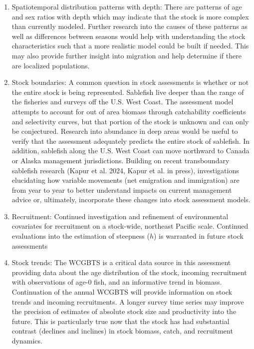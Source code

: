 \documentclass[
  english,
]{article}
\begin{document}
\begin{enumerate}

\item Spatiotemporal distribution patterns with depth: There are patterns of age and sex
ratios with depth which may indicate that the stock is more complex than currently
modeled. Further research into the causes of these patterns as well as differences
between seasons would help with understanding the stock characteristics such that
a more realistic model could be built if needed. This may also provide further insight into
migration and help determine if there are localized populations.

\item Stock boundaries: A common question in stock assessments is whether or not the
entire stock is being represented. Sablefish live deeper than the range of the fisheries
and surveys off the U.S. West Coast. The assessment model attempts to account for out of area biomass
through catchability coefficients and selectivity curves, but that portion of the stock is
unknown and can only be conjectured. Research into abundance in deep areas would
be useful to verify that the assessment adequately predicts the entire stock
of sablefish. In addition, sablefish along the U.S. West Coast can move northward to
Canada or Alaska management jurisdictions. Building on recent transboundary sablefish research
(Kapur et al. 2024, Kapur et al. in press), investigations elucidating how variable movements (net
emigration and immigration) are from year to year to better understand impacts on current
management advice or, ultimately, incorporate these changes into stock assessment models.

\item Recruitment: Continued investigation and refinement of environmental covariates for
recruitment on a stock-wide, northeast Pacific scale. Continued evaluations into the estimation
of steepness ($h$) is warranted in future stock assessments 

\item Stock trends: The WCGBTS is a critical data source in this assessment providing data
about the age distribution of the stock, incoming recruitment with observations of age-0 fish, and
an informative trend in biomass. Continuation of the annual WCGBTS will provide information
on stock trends and incoming recruitments. A longer survey time series may improve the precision of
estimates of absolute stock size and productivity into the future. This is particularly true now that
the stock has had substantial contrast (declines and inclines) in stock biomass, catch, and
recruitment dynamics. 


\end{enumerate}
\end{document}
